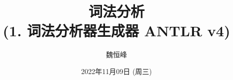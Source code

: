 \documentclass[]{beamer}
\title[词法分析]{词法分析 \\ (1. 词法分析器生成器 ANTLR v4)}
\author[魏恒峰]{\large 魏恒峰}
\institute{hfwei@nju.edu.cn}
\date{2022年11月09日 (周三)}
\begin{document}
\maketitle





\thankyou{}

\end{document}
